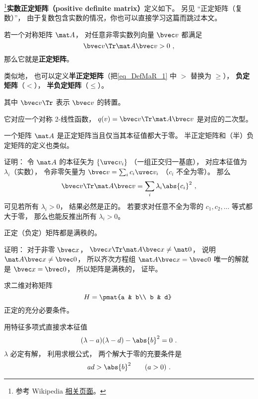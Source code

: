 

\footnote{参考 Wikipedia \href{https://en.wikipedia.org/wiki/Definite_matrix}{相关页面}。}\textbf{实数正定矩阵（positive definite matrix）}定义如下。 另见 “正定矩阵（复数）”， 由于复数包含实数的情况，你也可以直接学习这篇而跳过本文。
\begin{definition}{}
若一个对称矩阵 $\mat A$， 对任意非零实数列向量 $\bvec v$ 都满足
\begin{equation}\label{eq_DefMaR_1}
\bvec v\Tr \mat A \bvec v > 0~,
\end{equation}
那么它就是\textbf{正定矩阵}。

类似地， 也可以定义\textbf{半正定矩阵}（把\autoref{eq_DefMaR_1} 中 $>$ 替换为 $\geqslant$）， \textbf{负定矩阵}（$<$）， \textbf{半负定矩阵}（$\leqslant$）。
\end{definition}
其中 $\bvec v\Tr$ 表示 $\bvec v$ 的转置。

它对应一个对称 2-线性函数， $q(v) = \bvec v\Tr \mat A \bvec v$ 是对应的二次型。

\begin{theorem}{}
一个矩阵 $\mat A$ 是正定矩阵当且仅当其本征值都大于零。 半正定矩阵和（半）负定矩阵的定义也类似。
\end{theorem}

证明： 令 $\mat A$ 的本征矢为 $\{\uvec v_i\}$ （一组正交归一基底）， 对应本征值为 $\lambda_i$（实数）， 令非零矢量为 $\bvec v = \sum_i c_i \uvec v_i$ （$c_i$ 不全为零）。 那么
\begin{equation}
\bvec v\Tr \mat A \bvec v = \sum_i \lambda_i \abs{c_i}^2~,
\end{equation}
可见若所有 $\lambda_i > 0$， 结果必然是正的。 若要求对任意不全为零的 $c_1,c_2,\dots$ 等式都大于零， 那么也能反推出所有 $\lambda_i > 0$。

\begin{theorem}{}
正定（负定）矩阵都是满秩的。
\end{theorem}
证明： 对于非零 $\bvec x$， $\bvec x\Tr \mat A \bvec x \ne \mat 0$， 说明 $\mat A\bvec x \ne \bvec 0$， 所以齐次方程组 $\mat A\bvec x = \bvec 0$ 唯一的解就是 $\bvec x = \bvec 0$， 所以矩阵是满秩的， 证毕。

\begin{example}{}
求二维对称矩阵
\begin{equation}
H = \pmat{a & b\\ b & d}~
\end{equation}
正定的充分必要条件。

用特征多项式直接求本征值
\begin{equation}
(\lambda - a)(\lambda - d) - \abs{b}^2 = 0~.
\end{equation}
$\lambda$ 必定有解， 利用求根公式， 两个解大于零的充要条件是
\begin{equation}
ad > \abs{b}^2 \qquad (a > 0)~.
\end{equation}
\end{example}
